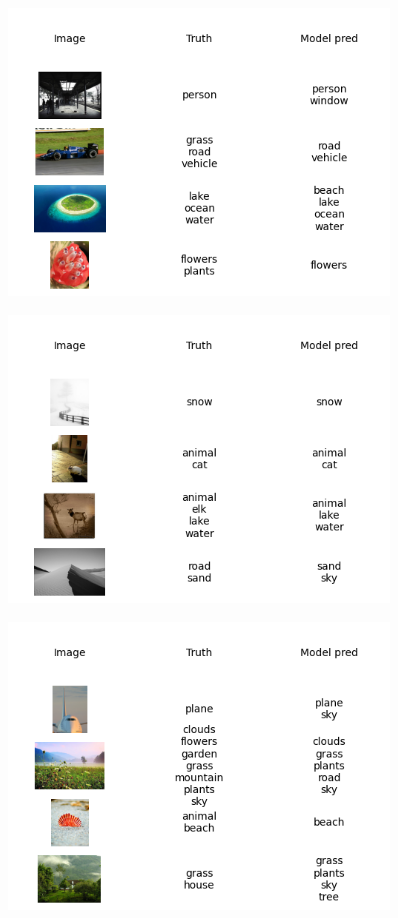 \documentclass{udstu}
\begin{document}
\begin{figure}[!ht]
	\centering
	\includegraphics[width=0.9\textwidth]{PNG/showcase-200}
	\caption{}
\end{figure}

\begin{figure}[!ht]
	\centering
	\includegraphics[width=0.9\textwidth]{PNG/showcase-225}
	\caption{}
\end{figure}

\begin{figure}[!ht]
	\centering
	\includegraphics[width=0.9\textwidth]{PNG/showcase-250}
	\caption{}
\end{figure}
\end{document}
